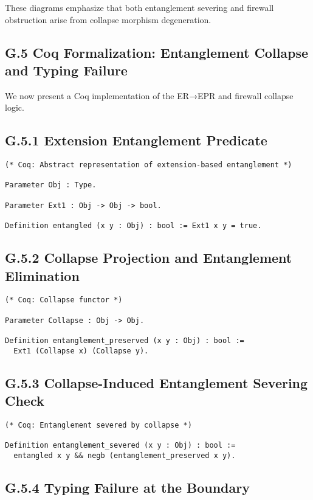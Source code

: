\documentclass[11pt]{article}
\begin{document}
These diagrams emphasize that both entanglement severing and firewall obstruction arise from collapse morphism degeneration.

\subsection*{G.5 Coq Formalization: Entanglement Collapse and Typing Failure}

We now present a Coq implementation of the ER→EPR and firewall collapse logic.

\subsection*{G.5.1 Extension Entanglement Predicate}

\begin{lstlisting}
(* Coq: Abstract representation of extension-based entanglement *)

Parameter Obj : Type.

Parameter Ext1 : Obj -> Obj -> bool.

Definition entangled (x y : Obj) : bool := Ext1 x y = true.
\end{lstlisting}

\subsection*{G.5.2 Collapse Projection and Entanglement Elimination}

\begin{lstlisting}
(* Coq: Collapse functor *)

Parameter Collapse : Obj -> Obj.

Definition entanglement_preserved (x y : Obj) : bool :=
  Ext1 (Collapse x) (Collapse y).
\end{lstlisting}

\subsection*{G.5.3 Collapse-Induced Entanglement Severing Check}

\begin{lstlisting}
(* Coq: Entanglement severed by collapse *)

Definition entanglement_severed (x y : Obj) : bool :=
  entangled x y && negb (entanglement_preserved x y).
\end{lstlisting}

\subsection*{G.5.4 Typing Failure at the Boundary}
\end{document}

